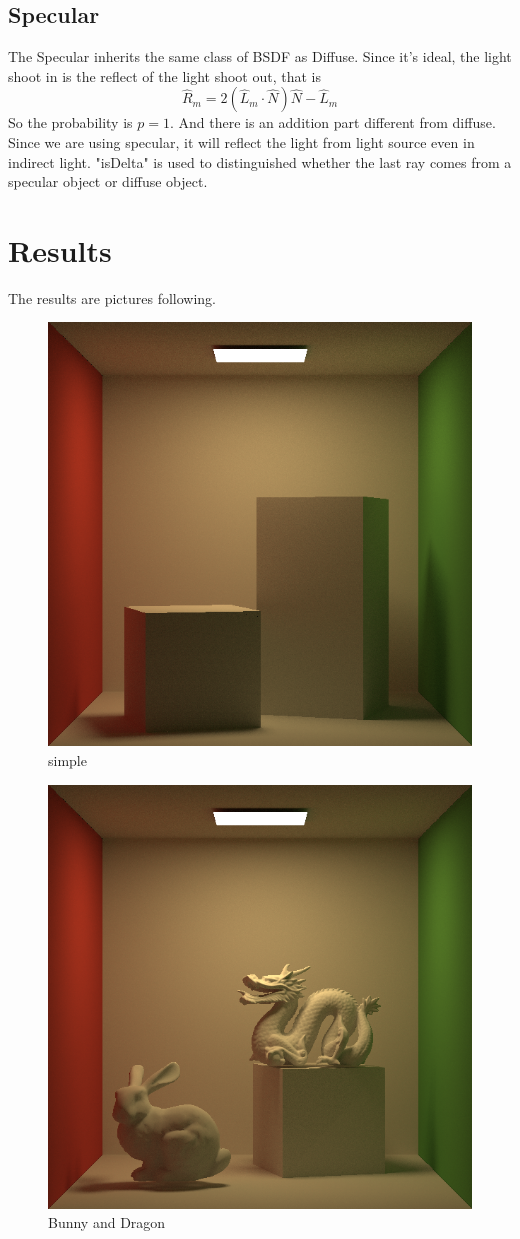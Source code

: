 \documentclass[acmtog]{acmart}
\begin{document}
\subsection{Specular}
The Specular inherits the same class of BSDF as Diffuse. Since it's ideal, the light shoot in is the reflect of the light shoot out, that is
$$\hat{R}_m=2(\hat{L}_m\cdot \hat{N})\hat{N}-\hat{L}_m$$
So the probability is $p=1$. And there is an addition part different from diffuse. Since we are using specular, it will reflect the light from light source even in indirect light. "isDelta" is used to distinguished whether the last ray comes from a specular object or diffuse object.
\section{Results}
The results are pictures following.\\
\begin{figure}[h]
	\centering
	\includegraphics[width=0.7\linewidth]{simple.png}
	\caption{simple}
	\label{fig:simple}
\end{figure}
\begin{figure}[h]
	\centering
	\includegraphics[width=0.7\linewidth]{BVH.png}
	\caption{Bunny and Dragon}
	\label{fig:BVH}
\end{figure}
\end{document}
